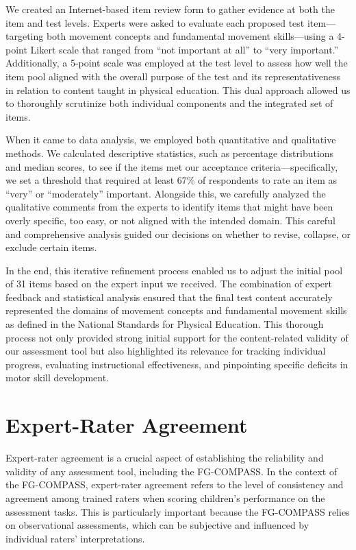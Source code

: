 \documentclass[
  letterpaper,
  DIV=11,
  numbers=noendperiod]{scrreprt}
\begin{document}
We created an Internet-based item review form to gather evidence at both
the item and test levels. Experts were asked to evaluate each proposed
test item---targeting both movement concepts and fundamental movement
skills---using a 4-point Likert scale that ranged from ``not important
at all'' to ``very important.'' Additionally, a 5-point scale was
employed at the test level to assess how well the item pool aligned with
the overall purpose of the test and its representativeness in relation
to content taught in physical education. This dual approach allowed us
to thoroughly scrutinize both individual components and the integrated
set of items.

When it came to data analysis, we employed both quantitative and
qualitative methods. We calculated descriptive statistics, such as
percentage distributions and median scores, to see if the items met our
acceptance criteria---specifically, we set a threshold that required at
least 67\% of respondents to rate an item as ``very'' or ``moderately''
important. Alongside this, we carefully analyzed the qualitative
comments from the experts to identify items that might have been overly
specific, too easy, or not aligned with the intended domain. This
careful and comprehensive analysis guided our decisions on whether to
revise, collapse, or exclude certain items.

In the end, this iterative refinement process enabled us to adjust the
initial pool of 31 items based on the expert input we received. The
combination of expert feedback and statistical analysis ensured that the
final test content accurately represented the domains of movement
concepts and fundamental movement skills as defined in the National
Standards for Physical Education. This thorough process not only
provided strong initial support for the content-related validity of our
assessment tool but also highlighted its relevance for tracking
individual progress, evaluating instructional effectiveness, and
pinpointing specific deficits in motor skill development.


\chapter{Expert-Rater Agreement}\label{expert-rater-agreement}

Expert-rater agreement is a crucial aspect of establishing the
reliability and validity of any assessment tool, including the
FG-COMPASS. In the context of the FG-COMPASS, expert-rater agreement
refers to the level of consistency and agreement among trained raters
when scoring children's performance on the assessment tasks. This is
particularly important because the FG-COMPASS relies on observational
assessments, which can be subjective and influenced by individual
raters' interpretations.
\end{document}
